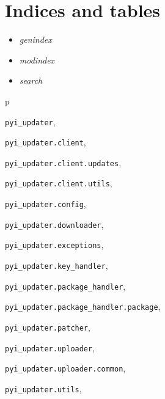 \documentclass[letterpaper,10pt,english]{sphinxmanual}
\begin{document}
\chapter{Indices and tables}
\label{index:indices-and-tables}\begin{itemize}
\item {} 
\emph{genindex}

\item {} 
\emph{modindex}

\item {} 
\emph{search}

\end{itemize}


\renewcommand{\indexname}{Python Module Index}
\begin{theindex}
\def\bigletter#1{{\Large\sffamily#1}\nopagebreak\vspace{1mm}}
\bigletter{p}
\item {\texttt{pyi\_updater}}, \pageref{api:module-pyi_updater}
\item {\texttt{pyi\_updater.client}}, \pageref{api:module-pyi_updater.client}
\item {\texttt{pyi\_updater.client.updates}}, \pageref{api:module-pyi_updater.client.updates}
\item {\texttt{pyi\_updater.client.utils}}, \pageref{api:module-pyi_updater.client.utils}
\item {\texttt{pyi\_updater.config}}, \pageref{api:module-pyi_updater.config}
\item {\texttt{pyi\_updater.downloader}}, \pageref{api:module-pyi_updater.downloader}
\item {\texttt{pyi\_updater.exceptions}}, \pageref{api:module-pyi_updater.exceptions}
\item {\texttt{pyi\_updater.key\_handler}}, \pageref{api:module-pyi_updater.key_handler}
\item {\texttt{pyi\_updater.package\_handler}}, \pageref{api:module-pyi_updater.package_handler}
\item {\texttt{pyi\_updater.package\_handler.package}}, \pageref{api:module-pyi_updater.package_handler.package}
\item {\texttt{pyi\_updater.patcher}}, \pageref{api:module-pyi_updater.patcher}
\item {\texttt{pyi\_updater.uploader}}, \pageref{api:module-pyi_updater.uploader}
\item {\texttt{pyi\_updater.uploader.common}}, \pageref{api:module-pyi_updater.uploader.common}
\item {\texttt{pyi\_updater.utils}}, \pageref{api:module-pyi_updater.utils}
\end{theindex}

\renewcommand{\indexname}{Index}
\printindex
\end{document}
